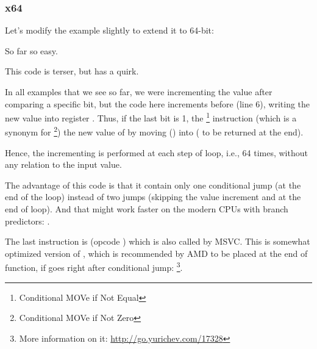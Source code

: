 \subsubsection{x64}
\label{subsec:popcnt}

Let's modify the example slightly to extend it to 64-bit:




So far so easy.






This code is terser, but has a quirk.

In all examples that we see so far, we were incrementing the  value after comparing a specific bit,
but the code here increments  before (line 6), writing the new value into register \EDX .
Thus, if the last bit is 1, the \CMOVNE\footnote{Conditional MOVe if Not Equal} instruction
(which is a synonym for \CMOVNZ\footnote{Conditional MOVe if Not Zero})  
the new value of 
by moving \EDX () into \EAX ( to be returned at the end).

Hence, the incrementing is performed at each step of loop, i.e., 64 times, without any relation to the input value.

The advantage of this code is that it contain only one conditional jump (at the end of the loop) instead of 
two jumps (skipping the  value increment and at the end of loop).
And that might work faster on the modern CPUs with branch predictors: .

\label{FATRET}
The last instruction is  (opcode ) 
which is also called  by MSVC.
This is somewhat optimized version of \RET, 
which is recommended by AMD to be placed at the end of function, if \RET goes right after conditional jump: 
\footnote{More information on it: \url{http://go.yurichev.com/17328}}.

